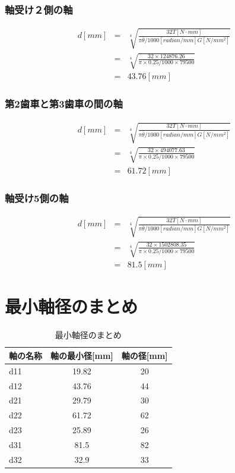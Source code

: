 \subsubsection{軸受け２側の軸}
\begin{eqnarray}
d[mm]&=&\sqrt[4]{\frac{32T[N \cdot mm]}{\pi \bar{\theta}/1000[radian/mm] G[N/mm^2]}}\\
     &=&\sqrt[4]{\frac{32\times 124876.26 }{\pi \times 0.25/1000 \times 79500}}\\
     &=&43.76[mm]
\end{eqnarray}
\subsubsection{第2歯車と第3歯車の間の軸}
\begin{eqnarray}
d[mm]&=&\sqrt[4]{\frac{32T[N \cdot mm]}{\pi \bar{\theta}/1000[radian/mm] G[N/mm^2]}}\\
     &=&\sqrt[4]{\frac{32\times 494077.63 }{\pi \times 0.25/1000 \times 79500}}\\
     &=&61.72[mm]
\end{eqnarray}
\subsubsection{軸受け5側の軸}
\begin{eqnarray}
d[mm]&=&\sqrt[4]{\frac{32T[N \cdot mm]}{\pi \bar{\theta}/1000[radian/mm] G[N/mm^2]}}\\
     &=&\sqrt[4]{\frac{32\times 1502808.35 }{\pi \times 0.25/1000 \times 79500}}\\
     &=&81.5[mm]
\end{eqnarray}
\section{最小軸径のまとめ}
\begin{table}[htb]
\begin{center}
  \caption{最小軸径のまとめ}
  \begin{tabular}{|l||c|c|} \hline
軸の名称&軸の最小径[mm]&軸の径[mm]\\\hline\hline
d11&19.82&20\\
d12&43.76&44\\
d21&29.79&30\\
d22&61.72&62\\
d23&25.89&26\\
d31&81.5&82\\
d32&32.9&33\\
\hline
  \end{tabular}
\end{center}
\end{table}
